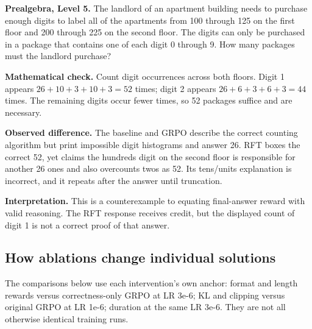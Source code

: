 \documentclass[10pt,letterpaper]{article}
\begin{document}
\textbf{Prealgebra, Level 5.} The landlord of an apartment building needs to purchase enough digits to label all of the apartments from 100 through 125 on the first floor and 200 through 225 on the second floor. The digits can only be purchased in a package that contains one of each digit 0 through 9. How many packages must the landlord purchase?

\textbf{Mathematical check.} Count digit occurrences across both floors. Digit 1 appears $26+10+3+10+3=52$ times; digit 2 appears $26+6+3+6+3=44$ times. The remaining digits occur fewer times, so 52 packages suffice and are necessary.

\textbf{Observed difference.} The baseline and GRPO describe the correct counting algorithm but print impossible digit histograms and answer 26. RFT boxes the correct 52, yet claims the hundreds digit on the second floor is responsible for another 26 ones and also overcounts twos as 52. Its tens/units explanation is incorrect, and it repeats after the answer until truncation.

\textbf{Interpretation.} This is a counterexample to equating final-answer reward with valid reasoning. The RFT response receives credit, but the displayed count of digit 1 is not a correct proof of that answer.

\clearpage\subsection*{How ablations change individual solutions}

The comparisons below use each intervention's own anchor: format and length rewards versus correctness-only GRPO at LR 3e-6; KL and clipping versus original GRPO at LR 1e-6; duration at the same LR 3e-6. They are not all otherwise identical training runs.
\end{document}
